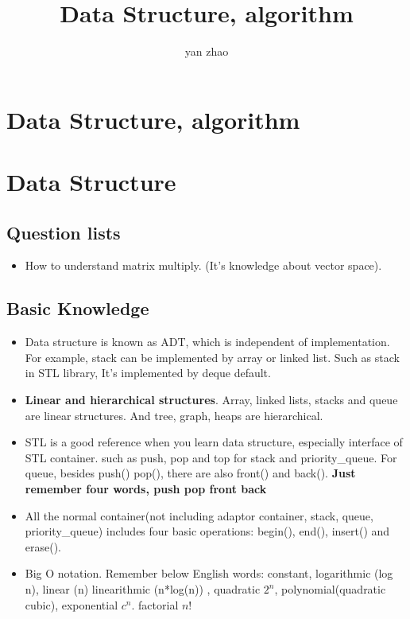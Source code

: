 \documentclass[a4paper,12pt,twoside]{book}
\begin{document}
\title{Data Structure, algorithm}
\author{yan zhao}
\date{}\maketitle

\else
\chapter{Data Structure, algorithm} 
\fi

\chapter{Data Structure}
\section{Question lists}
\begin{itemize}
\item How to understand matrix multiply. (It's knowledge about vector space). 
\end{itemize}


\section{Basic Knowledge}
\begin{itemize}
\item Data structure is known as ADT,  which is independent of implementation. For example, stack can be implemented by array or linked list. Such as stack in STL library, It's implemented by deque default.   

\item \textbf{Linear and hierarchical structures}. Array, linked lists, stacks and queue are linear structures. And tree, graph, heaps are hierarchical.

\item STL is a good reference when you learn data structure, especially interface of STL container. such as push, pop  and top for stack and priority\_queue. For queue, besides push() pop(),  there are also front() and back(). \textbf{Just remember four words, push pop front back}

\item All the normal container(not including adaptor container, stack, queue, priority\_queue) includes four basic operations: begin(), end(), insert() and erase(). 

\item Big O notation. Remember below English words: constant, logarithmic (log n), linear (n)  linearithmic (n*log(n)) , quadratic $2^{n}$, polynomial(quadratic cubic),  exponential $c^{n}$.  factorial $n!$
\end{itemize}
\end{document}
